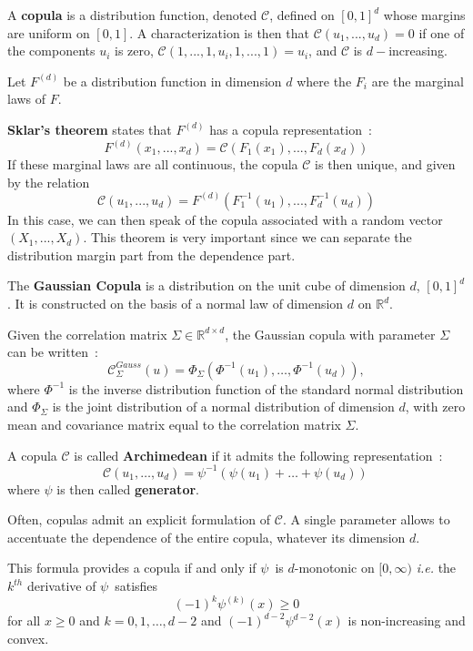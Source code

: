 \begin{f}[Copula]
A \textbf{copula} is a distribution function, denoted \(\mathcal{C}\), defined on \([0,1]^d\) whose margins are uniform on \([0,1]\). 
A characterization is then that \(\mathcal{C}(u_1,...,u_d)=0\) if one of the components \(u_i\) is zero, \(\mathcal{C}(1,...,1,u_i,1,...,1)=u_i\), and \(\mathcal{C}\) is \(d-\)increasing.
\medskip
		
Let \(F^{(d)}\) be a distribution function in dimension \(d\) where the \(F_i\) are the marginal laws of \(F\). 

\textbf{Sklar's theorem} states that \(F^{(d)}\) has a copula representation~:
\[
F^{(d)} (x_1,...,x_d) = \mathcal{C} (F_1(x_1),...,F_d(x_d))
\]
If these marginal laws are all continuous, the copula \(\mathcal{C}\) is then unique, and given by the relation 
\[
\mathcal{C}(u_1,...,u_d)=F^{(d)}(F_1^{-1} (u_1),...,F_d^{-1} (u_d))
\]
In this case, we can then speak of the copula associated with a random vector \((X_1,...,X_d)\).
This theorem is very important since we can separate the distribution margin part from the dependence part.
\medskip
	
The \textbf{Gaussian Copula} is a distribution on the unit cube of dimension \(d\), \([0,1]^d\).
It is constructed on the basis of a normal law of dimension \(d\) on \(\mathbb{R}^d\).

Given the correlation matrix \(\Sigma\in\mathbb{R}^{d\times d}\), the Gaussian copula with parameter \(\Sigma\) can be written~:
\[
\mathcal{C}_\Sigma^{Gauss}(u) = \Phi_\Sigma\left(\Phi^{-1}(u_1),\dots, \Phi^{-1}(u_d) \right), 
\]
where \(\Phi^{-1}\) is the inverse distribution function of the standard normal distribution and \(\Phi_\Sigma\) is the joint distribution of a normal distribution of dimension \(d\), with zero mean and covariance matrix equal to the correlation matrix \(\Sigma\).
\medskip	

	A copula \(\mathcal{C}\) is called \textbf{Archimedean} if it admits the following representation~:
\[
\mathcal{C}(u_1,\dots,u_d) = \psi^{-1}\left(\psi(u_1)+\dots+\psi(u_d)\right)\,
\]
where \(\psi\) is then called \textbf{generator}.

Often, copulas admit an explicit formulation of \(\mathcal{C}\). 
A single parameter allows to accentuate the dependence of the entire copula, whatever its dimension \(d\).


This formula provides a copula if and only if \(\psi\,\) is \(d\)-monotonic on \([0,\infty)\) \emph{i.e.} the \(k^{th}\) derivative of \(\psi\,\) satisfies
\[
(-1)^k\psi^{(k)}(x) \geq 0
\]
for all \(x\geq 0\) and \(k=0,1,\dots,d-2\) and \((-1)^{d-2}\psi^{d-2}(x)\) is non-increasing and convex.
\medskip


\end{f}
